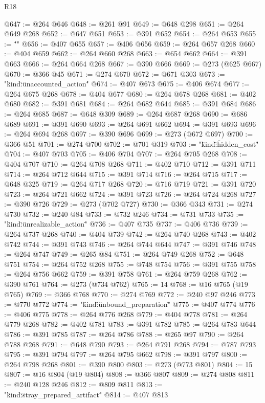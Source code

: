 \begin{lexlean}{R18}
\begin{coremodule}
{{{{{{{{{{{{{{{{{{{{{{{{{{{{{{{{{{{{{{{{{{{{{{{{{{{{{{{{{{{{{{{{{{{{{{{{{{{{{{{{{{{{{{{{{{{{{{{{{{{{{{{{{{{{{{{{{{{{{{{{{{{{{{{{{{{{{{@647 := @264 @646
@648 := @261 @91
@649 := @648 @298
@651 := @264 @649 @268
@652 := @647 @651
@653 := @391 @652
@654 := @264 @653
@655 := "\"}"
@656 := @407 @655
@657 := @406 @656
@659 := @264 @657 @268
@660 := @404 @659
@662 := @264 @660 @268
@663 := @654 @662
@664 := @391 @663
@666 := @264 @664 @268
@667 := @390 @666
@669 := @273 (@625 @667)
@670 := @366 @45
@671 := @274 @670
@672 := @671 @303
@673 := "{\"kind\":\"unaccounted_action\""
@674 := @407 @673
@675 := @406 @674
@677 := @264 @675 @268
@678 := @404 @677
@680 := @264 @678 @268
@681 := @402 @680
@682 := @391 @681
@684 := @264 @682 @644
@685 := @391 @684
@686 := @264 @685
@687 := @648 @309
@689 := @264 @687 @268
@690 := @686 @689
@691 := @391 @690
@693 := @264 @691 @662
@694 := @391 @693
@696 := @264 @694 @268
@697 := @390 @696
@699 := @273 (@672 @697)
@700 := @366 @51
@701 := @274 @700
@702 := @701 @319
@703 := "{\"kind\":\"hidden_cost\""
@704 := @407 @703
@705 := @406 @704
@707 := @264 @705 @268
@708 := @404 @707
@710 := @264 @708 @268
@711 := @402 @710
@712 := @391 @711
@714 := @264 @712 @644
@715 := @391 @714
@716 := @264 @715
@717 := @648 @325
@719 := @264 @717 @268
@720 := @716 @719
@721 := @391 @720
@723 := @264 @721 @662
@724 := @391 @723
@726 := @264 @724 @268
@727 := @390 @726
@729 := @273 (@702 @727)
@730 := @366 @343
@731 := @274 @730
@732 := @240 @84
@733 := @732 @246
@734 := @731 @733
@735 := "{\"kind\":\"unrealizable_action\""
@736 := @407 @735
@737 := @406 @736
@739 := @264 @737 @268
@740 := @404 @739
@742 := @264 @740 @268
@743 := @402 @742
@744 := @391 @743
@746 := @264 @744 @644
@747 := @391 @746
@748 := @264 @747
@749 := @265 @84
@751 := @264 @749 @268
@752 := @648 @751
@754 := @264 @752 @268
@755 := @748 @754
@756 := @391 @755
@758 := @264 @756 @662
@759 := @391 @758
@761 := @264 @759 @268
@762 := @390 @761
@764 := @273 (@734 @762)
@765 := 14
@768 := @16 @765 (@19 @765)
@769 := @366 @768
@770 := @274 @769
@772 := @240 @97 @246
@773 := @770 @772
@774 := "{\"kind\":\"unbound_preparation\""
@775 := @407 @774
@776 := @406 @775
@778 := @264 @776 @268
@779 := @404 @778
@781 := @264 @779 @268
@782 := @402 @781
@783 := @391 @782
@785 := @264 @783 @644
@786 := @391 @785
@787 := @264 @786
@788 := @265 @97
@790 := @264 @788 @268
@791 := @648 @790
@793 := @264 @791 @268
@794 := @787 @793
@795 := @391 @794
@797 := @264 @795 @662
@798 := @391 @797
@800 := @264 @798 @268
@801 := @390 @800
@803 := @273 (@773 @801)
@804 := 15
@807 := @16 @804 (@19 @804)
@808 := @366 @807
@809 := @274 @808
@811 := @240 @128 @246
@812 := @809 @811
@813 := "{\"kind\":\"stray_prepared_artifact\""
@814 := @407 @813
}}}}}}}}}}}}}}}}}}}}}}}}}}}}}}}}}}}}}}}}}}}}}}}}}}}}}}}}}}}}}}}}}}}}}}}}}}}}}}}}}}}}}}}}}}}}}}}}}}}}}}}}}}}}}}}}}}}}}}}}}}}}}}}}}}}}}}}}}}
\end{coremodule}
\end{lexlean}
